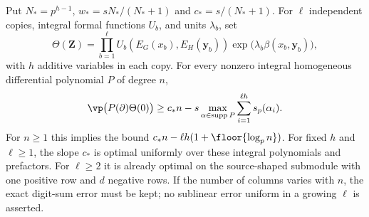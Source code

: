 \begin{corollary}
Put $N_*=p^{h-1}$, $w_*=sN_* /(N_*+1)$ and $c_*=s/(N_*+1)$.
For $\ell$ independent copies, integral formal functions $U_b$, and units $\lambda_b$, set
\[
 \Theta(\mathbf Z)=\prod_{b=1}^{\ell}
 U_b(E_G(x_b),E_H(\mathbf y_b))
 \exp\bigl(\lambda_b\beta(x_b,\mathbf y_b)\bigr),
\]
with $h$ additive variables in each copy.
For every nonzero integral homogeneous differential polynomial $P$ of degree $n$,
\begin{equation}\label{eq:harmonicuniversal}
 \vp\bigl(P(\partial)\Theta(0)\bigr)
 \ge c_*n-s\max_{\alpha\in\operatorname{supp}P}
                  \sum_{i=1}^{\ell h}s_p(\alpha_i).
\end{equation}
For $n\ge1$ this implies the bound
$c_*n-\ell h(1+\floor{\log_p n})$.
For fixed $h$ and $\ell\ge1$, the slope $c_*$ is optimal uniformly over these integral polynomials and prefactors.
For $\ell\ge2$ it is already optimal on the source-shaped  submodule with one positive row and $d$ negative rows.
If the number of columns varies with $n$, the exact digit-sum error must be kept; no sublinear error uniform in a growing $\ell$ is asserted.
\end{corollary}

